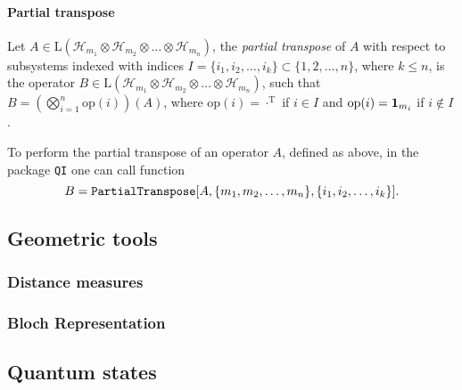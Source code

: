\documentclass[11pt,a4paper]{article}
\newcommand{\qi}{\texttt{QI}}
\newcommand{\Hilb}[1]{\mathcal{H}_{#1}}
\newcommand{\Lin}{\mathrm{L}}
\newcommand{\1}{{\bf 1}}
\newcommand{\fname}[1]{\text{\texttt{#1}}}
\begin{document}
\paragraph{Partial transpose}
Let $A\in \Lin(\Hilb{m_1}\otimes \Hilb{m_2}\otimes \ldots \otimes \Hilb{m_n})$,
the \emph{partial transpose} of $A$ with respect to subsystems indexed with 
indices $I=\{i_1, i_2, \ldots, i_k\}\subset \{1,2,\ldots, n\}$, where $k\leq 
n$, is the operator $B\in \Lin(\Hilb{m_1}\otimes \Hilb{m_2}\otimes \ldots 
\otimes \Hilb{m_n})$, such that $B=(\bigotimes_{i=1}^{n} \mathrm{op}(i))(A)$, 
where $\mathrm{op}(i)=\cdot^{\mathrm T}$ if $i\in I$ and 
$\mathrm{op}(i)=\1_{m_i}$ if $i\notin I$.

To perform the partial transpose of an operator $A$, defined as above, in the 
package \qi{} one can call function
\begin{equation}
B=\fname{PartialTranspose}[A, \{m_1, m_2, \ldots, m_n\}, \{i_1, i_2, 
\ldots, i_k\}].
\end{equation} 

\subsection{Geometric tools}

\subsubsection{Distance measures}

\subsubsection{Bloch Representation}

\subsection{Quantum states}
\end{document}
